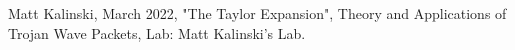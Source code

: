 \newpage

\begin{thebibliography}{9}
\thispagestyle{fancy}
     Matt Kalinski, March 2022, "The Taylor Expansion", Theory and Applications of Trojan Wave Packets, Lab: Matt Kalinski's Lab.
    
\end{thebibliography}
